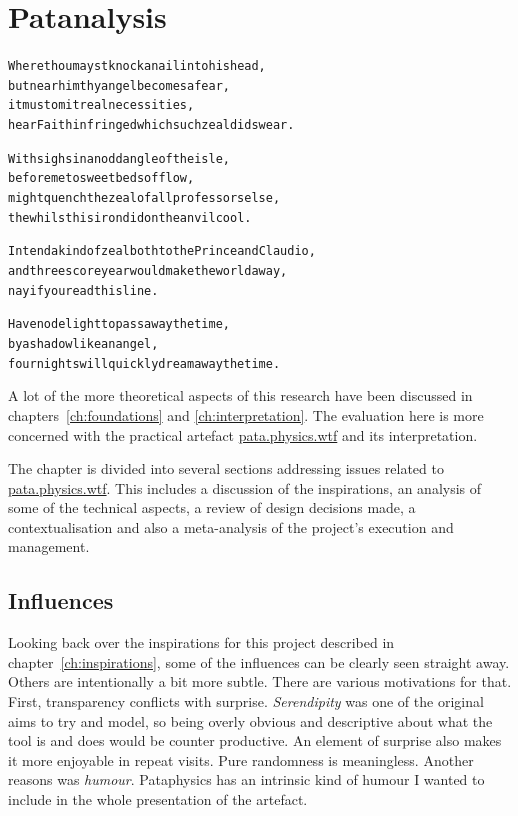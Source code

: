 
\chapter{Patanalysis}
\label{ch:analysis}

\startcontents[chapters]

\vfill

\begin{alltt}\sffamily
Where thou mayst knock a nail into his head,
but near him thy angel becomes a fear,
it must omit real necessities,
hear Faith infringed which such zeal did swear.

With sighs in an odd angle of the isle,
before me to sweet beds of flow,
might quench the zeal of all professors else,
the whilst his iron did on the anvil cool.

Intend a kind of zeal both to the Prince and Claudio,
and threescore year would make the world away,
nay if you read this line.

Have no delight to pass away the time,
by a shadow like an angel,
four nights will quickly dream away the time.
\end{alltt}

\newpage
\minicontents
\spirals

A lot of the more theoretical aspects of this research have been discussed in chapters~\ref{ch:foundations} and \ref{ch:interpretation}. The evaluation here is more concerned with the practical artefact \url{pata.physics.wtf} and its interpretation.

The chapter is divided into several sections addressing issues related to \url{pata.physics.wtf}. This includes a discussion of the inspirations, an analysis of some of the technical aspects, a review of design decisions made, a contextualisation and also a meta-analysis of the project's execution and management.


\section{Influences}

Looking back over the inspirations for this project described in chapter~\ref{ch:inspirations}, some of the influences can be clearly seen straight away. Others are intentionally a bit more subtle. There are various motivations for that. First, transparency conflicts with surprise. \emph{Serendipity} was one of the original aims to try and model, so being overly obvious and descriptive about what the tool is and does would be counter productive. An element of surprise also makes it more enjoyable in repeat visits. Pure randomness is meaningless. Another reasons was \emph{humour}. Pataphysics has an intrinsic kind of humour I wanted to include in the whole presentation of the artefact. 

